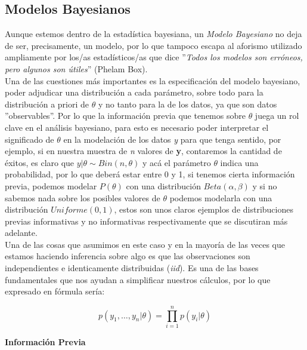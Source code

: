 \documentclass[12pt]{article}
\begin{document}
\subsection{Modelos Bayesianos}

Aunque estemos dentro de la estadística bayesiana, un \textit{Modelo Bayesiano} no deja de ser, precisamente, un modelo, por lo que tampoco escapa al aforismo utilizado ampliamente por los/as estadísticos/as que dice ''\textit{Todos los modelos son erróneos, pero algunos son útiles}'' (Phelam Box).\\

Una de las cuestiones más importantes es la especificación del modelo bayesiano, poder adjudicar una distribución a cada parámetro, sobre todo para la distribución a priori de $\theta$ y no tanto para la de los datos, ya que son datos ''observables''. Por lo que la información previa que tenemos sobre $\theta$ juega un rol clave en el análisis bayesiano, para esto es necesario poder interpretar el significado de $\theta$ en la modelación de los datos \textit{y} para que tenga sentido, por ejemplo, si en nuestra muestra de \textit{n} valores de \textbf{y}, contaremos la cantidad de éxitos, es claro que $y|\theta \sim Bin(n,\theta)$ y acá el parámetro $\theta$ indica una probabilidad, por lo que deberá estar entre 0 y 1, si tenemos cierta información previa, podemos modelar $P(\theta)$ con una distribución $Beta(\alpha,\beta)$ y si no sabemos nada sobre los posibles valores de $\theta$ podemos modelarla con una distribución $Uniforme(0,1)$, estos son unos claros ejemplos de distribuciones previas informativas y no informativas respectivamente que se discutiran más adelante.\\

Una de las cosas que asumimos en este caso y en la mayoría de las veces que estamos haciendo inferencia sobre algo es que las observaciones son independientes e identicamente distribuidas (\textit{iid}). Es una de las bases fundamentales que nos ayudan a simplificar nuestros cálculos, por lo que expresado en fórmula sería:

\[
p(y_1,\ldots,y_n|\theta)=\prod_{i=1}^n p(y_i|\theta)
\]

\begin{center}
	\textbf{Información Previa}
\end{center}
\end{document}
